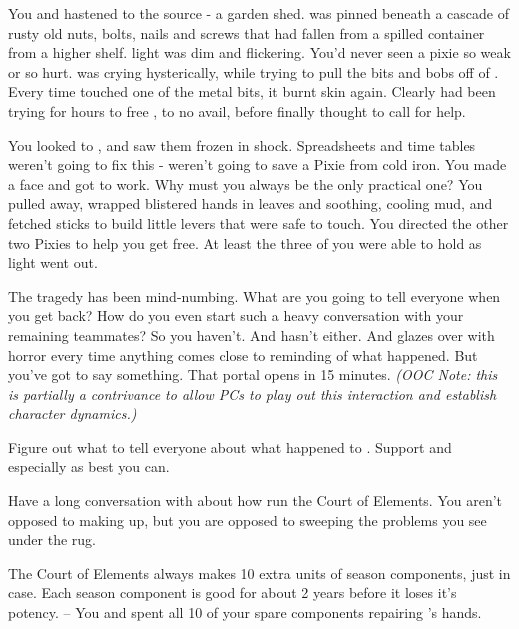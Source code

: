 \documentclass[char]{PP}
\begin{document}
You and \cSPM{} hastened to the source - a garden shed. \cFLost{} was pinned beneath a cascade of rusty old nuts, bolts, nails and screws that had fallen from a spilled container from a higher shelf. \cFLost{\Their} light was dim and flickering. You’d never seen a pixie so weak or so hurt. \cMChange{} was crying hysterically, while trying to pull the bits and bobs off of \cFLost{}. Every time \cMChange{} touched one of the metal bits, it burnt \cMChange{\their} skin again. Clearly \cMChange{\they} had been trying for hours to free \cFLost{}, to no avail, before \cMChange{\they} finally thought to call for help.

You looked to \cSPM{}, and saw them frozen in shock. Spreadsheets and time tables weren’t going to fix this - weren’t going to save a Pixie from cold iron. You made a face and got to work. Why must you always be the only practical one? You pulled \cMChange{} away, wrapped \cMChange{\their} blistered hands in leaves and soothing, cooling mud, and fetched sticks to build little levers that were safe to touch. You directed the other two Pixies to help you get \cFLost{} free. At least the three of you were able to hold \cFLost{\them} as \cFLost{\their} light went out.

The tragedy has been mind-numbing. What are you going to tell everyone when you get back? How do you even start such a heavy conversation with your remaining teammates? So you haven’t. And \cSPM{} hasn’t either. And \cMChange{} glazes over with horror every time anything comes close to reminding \cMChange{\them} of what happened. But you’ve got to say something. That portal opens in 15 minutes. \textit{(OOC Note: this is partially a contrivance to allow PCs to play out this interaction and establish character dynamics.)}


\begin{itemz}
	\item Figure out what to tell everyone about what happened to \cFLost{}. Support \cSPM{} and especially \cMChange{} as best you can.
	\item Have a long conversation with \cEHead{} about how \cEHead{\they} run\cEHead{\plural} the Court of Elements. You aren’t opposed to making up, but you are opposed to sweeping the problems you see under the rug.
\end{itemz}

\begin{itemz}[Notes]
	\item The Court of Elements always makes 10 extra units of season components, just in case. Each season component is good for about 2 years before it loses it's potency. -- You and \cSPM{} spent all 10 of your spare components repairing \cMChange{}'s hands.
\end{itemz}
\end{document}

